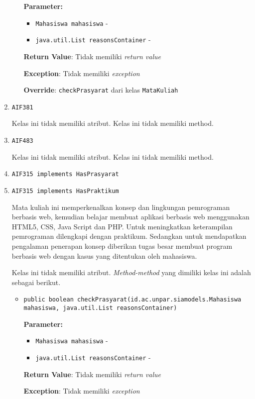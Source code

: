 \documentclass{article}
\begin{document}
\begin{enumerate}
\begin{itemize}
\textbf{Parameter:}
\begin{itemize}
\item \texttt{Mahasiswa mahasiswa} - 
\item \texttt{java.util.List reasonsContainer} - 
\end{itemize}
\textbf{Return Value}: Tidak memiliki \textit{return value}

\textbf{Exception}: Tidak memiliki \textit{exception}

\textbf{Override}: \texttt{checkPrasyarat} dari kelas \texttt{MataKuliah}

\end{itemize}
\item \texttt{AIF381}



Kelas ini tidak memiliki atribut. Kelas ini tidak memiliki method. \item \texttt{AIF483}



Kelas ini tidak memiliki atribut. Kelas ini tidak memiliki method. \item \texttt{AIF315 implements HasPrasyarat}

\item \texttt{AIF315 implements HasPraktikum}

Mata kuliah ini memperkenalkan konsep dan lingkungan pemrograman berbasis web,
 kemudian belajar membuat aplikasi berbasis web menggunakan HTML5, CSS, Java Script 
 dan PHP. Untuk meningkatkan keterampilan pemrograman dilengkapi dengan praktikum. 
 Sedangkan untuk mendapatkan pengalaman penerapan konsep diberikan tugas besar membuat 
 program berbasis web dengan kasus yang ditentukan oleh mahasiswa.

Kelas ini tidak memiliki atribut. \textit{Method-method} yang dimiliki kelas ini adalah sebagai berikut.
\begin{itemize}
\item \texttt{public boolean checkPrasyarat(id.ac.unpar.siamodels.Mahasiswa mahasiswa, java.util.List reasonsContainer)}



\textbf{Parameter:}
\begin{itemize}
\item \texttt{Mahasiswa mahasiswa} - 
\item \texttt{java.util.List reasonsContainer} - 
\end{itemize}
\textbf{Return Value}: Tidak memiliki \textit{return value}

\textbf{Exception}: Tidak memiliki \textit{exception}


\end{itemize}
\end{enumerate}
\end{document}
